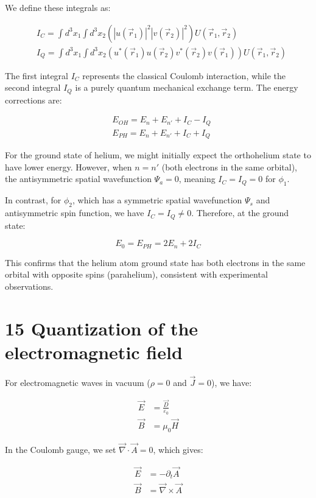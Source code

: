 \documentclass[10pt]{article}
\begin{document}
We define these integrals as:

\begin{align*}
&I_C=\int d^3x_1\int d^3x_2(|u(\vec{r}_1)|^2|v(\vec{r}_2)|^2)U(\vec{r}_1,\vec{r}_2)\\
&I_Q=\int d^3x_1\int d^3x_2(u^*(\vec{r}_1)u(\vec{r}_2)v^*(\vec{r}_2)v(\vec{r}_1))U(\vec{r}_1,\vec{r}_2) \tag{14.45}
\end{align*}

The first integral $I_C$ represents the classical Coulomb interaction, while the second integral $I_Q$ is a purely quantum mechanical exchange term. The energy corrections are:

\begin{align*}
&E_{OH}=E_n+E_{n'}+I_C-I_Q\\
&E_{PH}=E_n+E_{n'}+I_C+I_Q \tag{14.46}
\end{align*}


For the ground state of helium, we might initially expect the orthohelium state to have lower energy. However, when $n=n'$ (both electrons in the same orbital), the antisymmetric spatial wavefunction $\Psi_a=0$, meaning $I_C=I_Q=0$ for $\phi_1$.

In contrast, for $\phi_2$, which has a symmetric spatial wavefunction $\Psi_s$ and antisymmetric spin function, we have $I_C=I_Q\neq 0$. Therefore, at the ground state:

\begin{equation*}
E_0=E_{PH}=2E_n+2I_C \tag{14.47}
\end{equation*}

This confirms that the helium atom ground state has both electrons in the same orbital with opposite spins (parahelium), consistent with experimental observations.

\section*{15 Quantization of the electromagnetic field}
For electromagnetic waves in vacuum ($\rho=0$ and $\vec{J}=0$), we have:

\begin{align*}
\vec{E}&=\frac{\vec{D}}{\varepsilon_0} \tag{15.1}\\
\vec{B}&=\mu_0\vec{H}
\end{align*}

In the Coulomb gauge, we set $\vec{\nabla}\cdot\vec{A}=0$, which gives:

\begin{align*}
\vec{E}&=-\partial_t\vec{A}\\
\vec{B}&=\vec{\nabla}\times\vec{A} \tag{15.2}
\end{align*}
\end{document}
